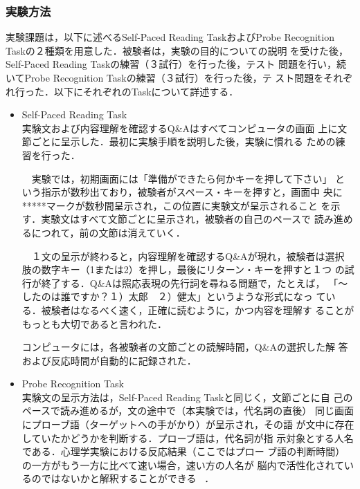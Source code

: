 \subsubsection{実験方法}
\vspace{-2mm}
  実験課題は，以下に述べるSelf-Paced Reading TaskおよびProbe
Recognition Taskの２種類を用意した．被験者は，実験の目的についての説明
を受けた後，Self-Paced Reading Taskの練習（３試行）を行った後，テスト
問題を行い，続いてProbe Recognition Taskの練習（３試行）を行った後，テ
スト問題をそれぞれ行った．以下にそれぞれのTaskについて詳述する．

\begin{itemize}
  \item Self-Paced Reading Task\\
     実験文および内容理解を確認するQ\&Aはすべてコンピュータの画面
     上に文節ごとに呈示した．最初に実験手順を説明した後，実験に慣れる
     ための練習を行った．

     　実験では，初期画面には「準備ができたら何かキーを押して下さい」
     という指示が数秒出ており，被験者がスペース・キーを押すと，画面中
     央に*****マークが数秒間呈示され，この位置に実験文が呈示されること
     を示す．実験文はすべて文節ごとに呈示され，被験者の自己のペースで
     読み進めるにつれて，前の文節は消えていく．

     　１文の呈示が終わると，内容理解を確認するQ\&Aが現れ，被験者は選択
     肢の数字キー（1または2）を押し，最後にリターン・キーを押すと１つ
     の試行が終了する．Q\&Aは照応表現の先行詞を尋ねる問題で，たとえば，
     「〜したのは誰ですか？１）太郎　２）健太」というような形式になっ
     ている．被験者はなるべく速く，正確に読むように，かつ内容を理解す
     ることがもっとも大切であると言われた．
 
       コンピュータには，各被験者の文節ごとの読解時間，Q\&Aの選択した解
     答および反応時間が自動的に記録された．
  \item Probe Recognition Task\\
    実験文の呈示方法は，Self-Paced Reading Taskと同じく，文節ごとに自
     己のペースで読み進めるが，文の途中で（本実験では，代名詞の直後）
     同じ画面にプローブ語（ターゲットへの手がかり）が呈示され，その語
     が文中に存在していたかどうかを判断する．プローブ語は，代名詞が指
     示対象とする人名である．心理学実験における反応結果（ここではプロー
     ブ語の判断時間）の一方がもう一方に比べて速い場合，速い方の人名が
     脳内で活性化されているのではないかと解釈することができる~
     \cite{abe:1994}．

\end{itemize}

